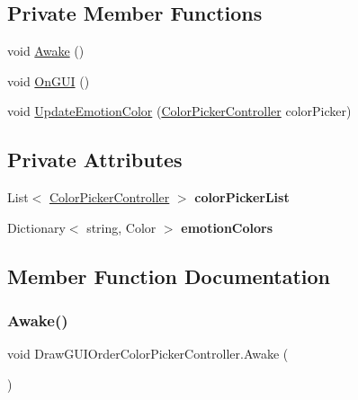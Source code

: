 \subsection*{Private Member Functions}
\begin{DoxyCompactItemize}
\item 
void \mbox{\hyperlink{class_draw_g_u_i_order_color_picker_controller_a136909499706686ed28535f0fbc70553}{Awake}} ()
\item 
void \mbox{\hyperlink{class_draw_g_u_i_order_color_picker_controller_a4c368507ba0d1c2f1896a38e5aec8006}{On\+G\+UI}} ()
\item 
void \mbox{\hyperlink{class_draw_g_u_i_order_color_picker_controller_a80f6160ddce320ca94c0dd24b5662c7e}{Update\+Emotion\+Color}} (\mbox{\hyperlink{class_color_picker_controller}{Color\+Picker\+Controller}} color\+Picker)
\end{DoxyCompactItemize}
\subsection*{Private Attributes}
\begin{DoxyCompactItemize}
\item 
\mbox{\label{class_draw_g_u_i_order_color_picker_controller_ac3031242bcca645aeb85fa6059edf6d2}} 
List$<$ \mbox{\hyperlink{class_color_picker_controller}{Color\+Picker\+Controller}} $>$ {\bfseries color\+Picker\+List}
\item 
\mbox{\label{class_draw_g_u_i_order_color_picker_controller_ae20ab41aab24e27804ea24d82644fefa}} 
Dictionary$<$ string, Color $>$ {\bfseries emotion\+Colors}
\end{DoxyCompactItemize}


\subsection{Member Function Documentation}
\mbox{\label{class_draw_g_u_i_order_color_picker_controller_a136909499706686ed28535f0fbc70553}} 
\subsubsection{\texorpdfstring{Awake()}{Awake()}}
{\footnotesize\ttfamily void Draw\+G\+U\+I\+Order\+Color\+Picker\+Controller.\+Awake (\begin{DoxyParamCaption}{ }\end{DoxyParamCaption})\hspace{0.3cm}{\ttfamily [private]}}

